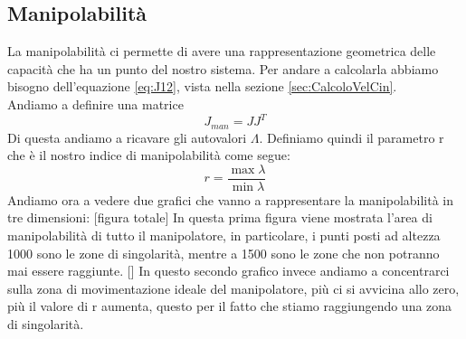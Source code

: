 \subsection{Manipolabilità}
La manipolabilità ci permette di avere una rappresentazione geometrica delle capacità che ha un punto del nostro sistema. Per andare a calcolarla abbiamo bisogno dell'equazione \ref{eq:J12}, vista nella sezione \ref{sec:CalcoloVelCin}.
\\Andiamo a definire una matrice
\begin{equation*}
    J_{man} = JJ^T
\end{equation*}
Di questa andiamo a ricavare gli autovalori $\Lambda$. Definiamo quindi il parametro r che è il nostro indice di manipolabilità come segue:
\begin{equation}
    r = \frac{\max\lambda}{\min\lambda}
\end{equation}
Andiamo ora a vedere due grafici che vanno a rappresentare la manipolabilità in tre dimensioni:
[figura totale]
In questa prima figura viene mostrata l'area di manipolabilità di tutto il manipolatore, in particolare, i punti posti ad altezza 1000 sono le zone di singolarità, mentre a 1500 sono le zone che non potranno mai essere raggiunte.
[]
In questo secondo grafico invece andiamo a concentrarci sulla zona di movimentazione ideale del manipolatore, più ci si avvicina allo zero, più il valore di r aumenta, questo per il fatto che stiamo raggiungendo una zona di singolarità.
